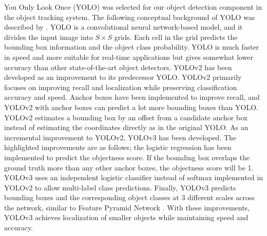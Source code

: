 You Only Look Once (YOLO) \cite{redmon_you_2016} was selected for our object detection component in the object tracking system. The following conceptual background of YOLO was described by \citeauthor{redmon_you_2016} \cite{redmon_you_2016}. YOLO is a convolutional neural network-based model, and it divides the input image into $S \times S$ grids. Each cell in the grid predicts the bounding box information and the object class probability. YOLO is much faster in speed and more suitable for real-time applications but gives somewhat lower accuracy than other state-of-the-art object detectors. YOLOv2 \cite{redmon_yolo9000_2017} has been developed as an improvement to its predecessor YOLO. YOLOv2 primarily focuses on improving recall and localization while preserving classification accuracy and speed. Anchor boxes have been implemented to improve recall, and YOLOv2 with anchor boxes can predict a lot more bounding boxes than YOLO. YOLOv2 estimates a bounding box by an offset from a candidate anchor box instead of estimating the coordinates directly as in the original YOLO. As an incremental improvement to YOLOv2, YOLOv3 \cite{redmon_yolov3_2018} has been developed. The highlighted improvements are as follows; the logistic regression has been implemented to predict the objectness score. If the bounding box overlaps the ground truth more than any other anchor boxes, the objectness score will be 1. YOLOv3 uses an independent logistic classifier instead of softmax implemented in YOLOv2 to allow multi-label class predictions. Finally, YOLOv3 predicts bounding boxes and the corresponding object classes at 3 different scales across the network, similar to Feature Pyramid Network \cite{lin_feature_2017}. With these improvements, YOLOv3 achieves localization of smaller objects while maintaining speed and accuracy.

